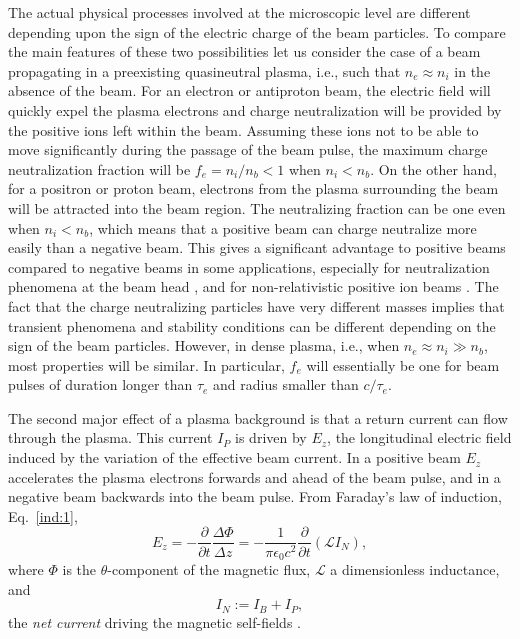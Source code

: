 \documentclass [12pt,a4paper,     ]{report} %
\newcommand{\DEF}{:=}                 %
\begin{document}
	The actual physical processes involved at the microscopic level are different depending upon the sign of the electric charge of the beam particles. To compare the main features of these two possibilities let us consider the case of a beam propagating in a preexisting quasineutral plasma, i.e., such that $n_e \approx n_i$ in the absence of the beam.  For an electron or antiproton beam, the electric field will quickly expel the plasma electrons and charge neutralization will be provided by the positive ions left within the beam.  Assuming these ions not to be able to move significantly during the passage of the beam pulse, the maximum charge neutralization fraction will be $f_e  = n_i/n_b < 1$ when $n_i < n_b$.  On the other hand, for a positron or proton beam, electrons from the plasma surrounding the beam will be attracted into the beam region.  The neutralizing fraction can be one even when $n_i < n_b$, which means that a positive beam can charge neutralize more easily than a negative beam.  This gives a significant advantage to positive beams compared to negative beams in some applications, especially for neutralization phenomena at the beam head \cite{LOTOV1996-}, and for non-relativistic positive ion beams \cite{KAGAN2001-}.  The fact that the charge neutralizing particles have very different masses implies that transient phenomena and stability conditions can be different depending on the sign of the beam particles.  However, in dense plasma, i.e., when $n_e \approx n_i \gg n_b$, most properties will be similar.  In particular, $f_e$ will essentially be one for beam pulses of duration longer than $\tau_e$ and radius  smaller than $c/\tau_e$.


	The second major effect of a plasma background is that a return current can flow through the plasma.  This current $I_P$ is driven by $E_z$, the longitudinal electric field induced by the variation of the effective beam current.  In a positive beam $E_z$ accelerates the plasma electrons forwards and ahead of the  beam pulse, and in a negative beam backwards into the beam pulse.  From Faraday's law of induction, Eq.~\eqref{ind:1},
%
\begin{equation}\label{bcn:12} %
   E_z = - \frac{\partial}{\partial t} \frac{\Delta \Phi}{\Delta z}
       = -\frac{1}{\pi\epsilon_0 c^2}
          \frac{\partial}{\partial t} (\mathcal{L}I_N),
\end{equation}
%
where $\Phi$ is the $\theta$-component of the magnetic flux, $\mathcal{L}$ a dimensionless inductance, and
%
\begin{equation}\label{bcn:13} %
                 I_N \DEF I_B + I_P,
\end{equation}
%
the \emph{net current} driving the magnetic self-fields \cite{BRIGG1974-}.
\end{document}
